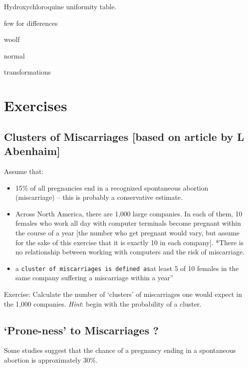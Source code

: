 \documentclass[]{book}
\providecommand{\tightlist}{%
  \setlength{\itemsep}{0pt}\setlength{\parskip}{0pt}}
\begin{document}
Hydroxychloroquine uniformity table.

few for differences

woolf

normal

transformations

\hypertarget{exercises-3}{%
\section{Exercises}\label{exercises-3}}

\hypertarget{clusters-of-miscarriages-based-on-article-by-l-abenhaim}{%
\subsection{Clusters of Miscarriages {[}based on article by L Abenhaim{]}}\label{clusters-of-miscarriages-based-on-article-by-l-abenhaim}}

Assume that:

\begin{itemize}
\tightlist
\item
  15\% of all pregnancies end in a recognized spontaneous abortion (miscarriage) -- this is probably a conservative estimate.
\item
  Across North America, there are 1,000 large companies. In each of them, 10 females who work all day with computer terminals become pregnant within the course of a year {[}the number who get pregnant would vary, but assume for the sake of this exercise that it is exactly 10 in each company{]}.
  *There is no relationship between working with computers and the risk of miscarriage.
\item
  a \texttt{cluster\textquotesingle{}\textquotesingle{}\ of\ miscarriages\ is\ defined\ as}at least 5 of 10 females in the same company suffering a miscarriage within a year''
\end{itemize}

Exercise: Calculate the number of `clusters' of miscarriages one would expect in the 1,000 companies. \emph{Hint}: begin with the probability of a cluster.

\hypertarget{prone-ness-to-miscarriages}{%
\subsection{`Prone-ness' to Miscarriages ?}\label{prone-ness-to-miscarriages}}

Some studies suggest that the chance of a pregnancy ending in a spontaneous abortion is approximately 30\%.
\end{document}
